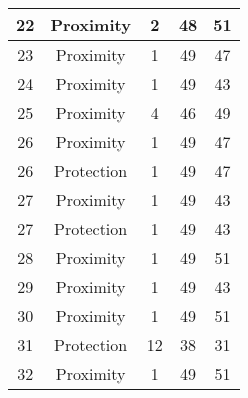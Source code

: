\documentclass[results.tex]{subfiles}
\begin{document}
\begin{center}
\begin{tabular}{| c || c | c | c | c |}
            \hline
            22                      & Proximity                    & 2                      & 48                      & 51                   \\
            \hline
            23                      & Proximity                    & 1                      & 49                      & 47                   \\
            \hline
            24                      & Proximity                    & 1                      & 49                      & 43                   \\
            \hline
            25                      & Proximity                    & 4                      & 46                      & 49                   \\
            \hline
            26                      & Proximity                    & 1                      & 49                      & 47                   \\
            \hline
            26                      & Protection                   & 1                      & 49                      & 47                   \\
            \hline
            27                      & Proximity                    & 1                      & 49                      & 43                   \\
            \hline
            27                      & Protection                   & 1                      & 49                      & 43                   \\
            \hline
            28                      & Proximity                    & 1                      & 49                      & 51                   \\
            \hline
            29                      & Proximity                    & 1                      & 49                      & 43                   \\
            \hline
            30                      & Proximity                    & 1                      & 49                      & 51                   \\
            \hline
            31                      & Protection                   & 12                     & 38                      & 31                   \\
            \hline
            32                      & Proximity                    & 1                      & 49                      & 51                   \\

\end{tabular}
\end{center}
\end{document}
